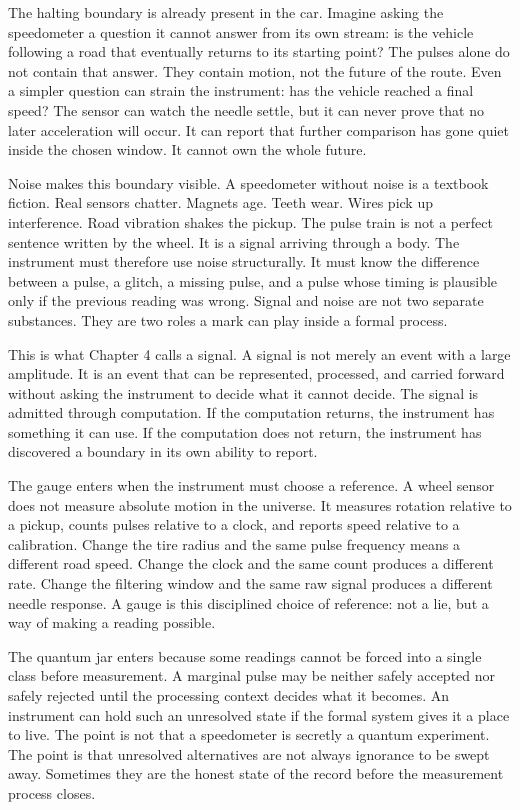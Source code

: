The halting boundary is already present in the car. Imagine asking the
speedometer a question it cannot answer from its own stream: is the vehicle
following a road that eventually returns to its starting point? The pulses
alone do not contain that answer. They contain motion, not the future of the
route. Even a simpler question can strain the instrument: has the vehicle
reached a final speed? The sensor can watch the needle settle, but it can
never prove that no later acceleration will occur. It can report that further
comparison has gone quiet inside the chosen window. It cannot own the whole
future.

Noise makes this boundary visible. A speedometer without noise is a textbook
fiction. Real sensors chatter. Magnets age. Teeth wear. Wires pick up
interference. Road vibration shakes the pickup. The pulse train is not a
perfect sentence written by the wheel. It is a signal arriving through a body.
The instrument must therefore use noise structurally. It must know the
difference between a pulse, a glitch, a missing pulse, and a pulse whose timing
is plausible only if the previous reading was wrong. Signal and noise are not
two separate substances. They are two roles a mark can play inside a formal
process.

This is what Chapter 4 calls a signal. A signal is not merely an event with a
large amplitude. It is an event that can be represented, processed, and carried
forward without asking the instrument to decide what it cannot decide. The
signal is admitted through computation. If the computation returns, the
instrument has something it can use. If the computation does not return, the
instrument has discovered a boundary in its own ability to report.

The gauge enters when the instrument must choose a reference. A wheel sensor
does not measure absolute motion in the universe. It measures rotation relative
to a pickup, counts pulses relative to a clock, and reports speed relative to a
calibration. Change the tire radius and the same pulse frequency means a
different road speed. Change the clock and the same count produces a different
rate. Change the filtering window and the same raw signal produces a different
needle response. A gauge is this disciplined choice of reference: not a lie,
but a way of making a reading possible.

The quantum jar enters because some readings cannot be forced into a single
class before measurement. A marginal pulse may be neither safely accepted nor
safely rejected until the processing context decides what it becomes. An
instrument can hold such an unresolved state if the formal system gives it a
place to live. The point is not that a speedometer is secretly a quantum
experiment. The point is that unresolved alternatives are not always ignorance
to be swept away. Sometimes they are the honest state of the record before the
measurement process closes.

